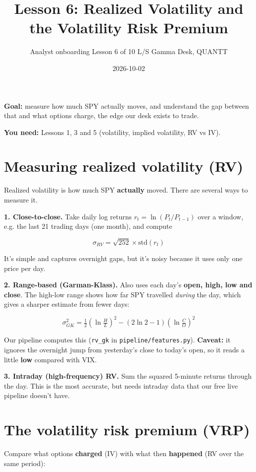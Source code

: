 \documentclass{article}
\title{Lesson 6: Realized Volatility and the Volatility Risk Premium}
\author{Analyst onboarding \textperiodcentered{} Lesson 6 of 10 \textperiodcentered{} L/S Gamma Desk, QUANTT}
\date{2026-10-02}
\begin{document}
\maketitle

\textbf{Goal:} measure how much SPY actually moves, and understand the gap between that and what options charge, the edge our desk exists to trade.

\textbf{You need:} Lessons 1, 3 and 5 (volatility, implied volatility, RV vs IV).

\section{Measuring realized volatility (RV)}

Realized volatility is how much SPY \textbf{actually} moved. There are several ways to measure it.

\textbf{1. Close-to-close.} Take daily log returns $r_t = \ln(P_t / P_{t-1})$ over a window, e.g. the last 21 trading days (one month), and compute

\[\sigma_{RV} = \sqrt{252} \times \text{std}(r_t)\]

It's simple and captures overnight gaps, but it's noisy because it uses only one price per day.

\textbf{2. Range-based (Garman-Klass).} Also uses each day's \textbf{open, high, low and close}. The high-low range shows how far SPY travelled \emph{during} the day, which gives a sharper estimate from fewer days:

\[\sigma^2_{GK} = \tfrac{1}{2}\left(\ln \tfrac{H}{L}\right)^2 - (2\ln 2 - 1)\left(\ln \tfrac{C}{O}\right)^2\]

Our pipeline computes this (\texttt{rv\_\allowbreak{}gk} in \texttt{pipeline/\allowbreak{}features.\allowbreak{}py}). \textbf{Caveat:} it ignores the overnight jump from yesterday's close to today's open, so it reads a little \textbf{low} compared with VIX.

\textbf{3. Intraday (high-frequency) RV.} Sum the squared 5-minute returns through the day. This is the most accurate, but needs intraday data that our free live pipeline doesn't have.

\section{The volatility risk premium (VRP)}

Compare what options \textbf{charged} (IV) with what then \textbf{happened} (RV over the same period):
\end{document}
